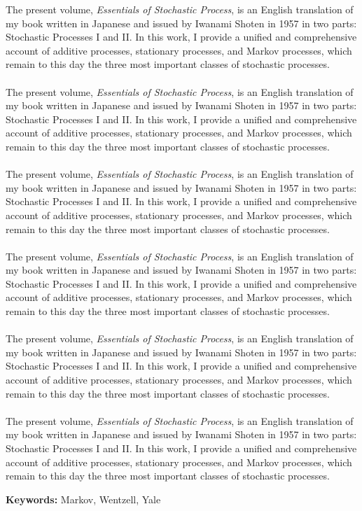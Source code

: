 \noindent The present volume, \textit{Essentials of Stochastic Process}, is
an English translation of my book written in Japanese and issued by Iwanami
Shoten in 1957 in two parts: Stochastic Processes I and II. In this  work, I
provide a unified and comprehensive account of additive processes, stationary processes, and Markov processes, which remain to this day the three most important classes of stochastic processes.\\\\
\noindent The present volume, \textit{Essentials of Stochastic Process}, is
an English translation of my book written in Japanese and issued by Iwanami
Shoten in 1957 in two parts: Stochastic Processes I and II. In this  work, I
provide a unified and comprehensive account of additive processes, stationary processes, and Markov processes, which remain to this day the three most important classes of stochastic processes.\\\\
\noindent The present volume, \textit{Essentials of Stochastic Process}, is
an English translation of my book written in Japanese and issued by Iwanami
Shoten in 1957 in two parts: Stochastic Processes I and II. In this  work, I
provide a unified and comprehensive account of additive processes, stationary processes, and Markov processes, which remain to this day the three most important classes of stochastic processes.\\\\
\noindent The present volume, \textit{Essentials of Stochastic Process}, is
an English translation of my book written in Japanese and issued by Iwanami
Shoten in 1957 in two parts: Stochastic Processes I and II. In this  work, I
provide a unified and comprehensive account of additive processes, stationary processes, and Markov processes, which remain to this day the three most important classes of stochastic processes.\\\\
\noindent The present volume, \textit{Essentials of Stochastic Process}, is
an English translation of my book written in Japanese and issued by Iwanami
Shoten in 1957 in two parts: Stochastic Processes I and II. In this  work, I
provide a unified and comprehensive account of additive processes, stationary processes, and Markov processes, which remain to this day the three most important classes of stochastic processes.\\\\
\noindent The present volume, \textit{Essentials of Stochastic Process}, is
an English translation of my book written in Japanese and issued by Iwanami
Shoten in 1957 in two parts: Stochastic Processes I and II. In this  work, I
provide a unified and comprehensive account of additive processes, stationary processes, and Markov processes, which remain to this day the three most important classes of stochastic processes.
\par
\vspace{1em}
\noindent\textbf{Keywords:} Markov, Wentzell, Yale

